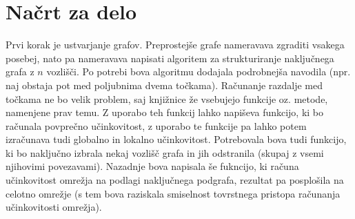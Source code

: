 \documentclass[a4paper, 16pt]{article}
\begin{document}
\section{Načrt za delo}

Prvi korak je ustvarjanje grafov. Preprostejše grafe nameravava zgraditi vsakega posebej, nato pa nameravava napisati algoritem za strukturiranje naključnega grafa z $n$ vozlišči.
Po potrebi bova algoritmu dodajala podrobnejša navodila (npr. naj obstaja pot med poljubnima dvema točkama). Računanje razdalje med točkama ne bo velik problem, saj knjižnice
že vsebujejo funkcije oz. metode, namenjene prav temu. Z uporabo teh funkcij lahko napiševa funkcijo, ki bo računala povprečno učinkovitost, z uporabo te funkcije pa lahko potem
izračunava tudi globalno in lokalno učinkovitost. Potrebovala bova tudi funkcijo, ki bo naključno izbrala nekaj vozlišč grafa in jih odstranila (skupaj z vsemi njihovimi povezavami).
Nazadnje bova napisala še fukncijo, ki računa učinkovitost omrežja na podlagi naključnega podgrafa, rezultat pa posplošila na celotno omrežje (s tem bova raziskala smiselnost
tovrstnega pristopa računanja učinkovitosti omrežja).
\end{document}
